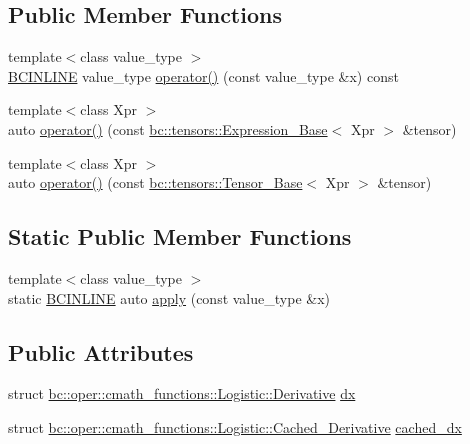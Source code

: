 \subsection*{Public Member Functions}
\begin{DoxyCompactItemize}
\item 
{\footnotesize template$<$class value\+\_\+type $>$ }\\\hyperlink{common_8h_a6699e8b0449da5c0fafb878e59c1d4b1}{B\+C\+I\+N\+L\+I\+NE} value\+\_\+type \hyperlink{structbc_1_1oper_1_1cmath__functions_1_1Logistic_acded51419444f65b49ba2504ac65e034}{operator()} (const value\+\_\+type \&x) const
\item 
{\footnotesize template$<$class Xpr $>$ }\\auto \hyperlink{structbc_1_1oper_1_1cmath__functions_1_1Logistic_a355f0d85fc7515ae5e8b7d804e101117}{operator()} (const \hyperlink{classbc_1_1tensors_1_1Expression__Base}{bc\+::tensors\+::\+Expression\+\_\+\+Base}$<$ Xpr $>$ \&tensor)
\item 
{\footnotesize template$<$class Xpr $>$ }\\auto \hyperlink{structbc_1_1oper_1_1cmath__functions_1_1Logistic_a722ef8ee07bd0966552de7101faddf66}{operator()} (const \hyperlink{classbc_1_1tensors_1_1Tensor__Base}{bc\+::tensors\+::\+Tensor\+\_\+\+Base}$<$ Xpr $>$ \&tensor)
\end{DoxyCompactItemize}
\subsection*{Static Public Member Functions}
\begin{DoxyCompactItemize}
\item 
{\footnotesize template$<$class value\+\_\+type $>$ }\\static \hyperlink{common_8h_a6699e8b0449da5c0fafb878e59c1d4b1}{B\+C\+I\+N\+L\+I\+NE} auto \hyperlink{structbc_1_1oper_1_1cmath__functions_1_1Logistic_ac01c5b86f77828ae7e3d46dd701684a6}{apply} (const value\+\_\+type \&x)
\end{DoxyCompactItemize}
\subsection*{Public Attributes}
\begin{DoxyCompactItemize}
\item 
struct \hyperlink{structbc_1_1oper_1_1cmath__functions_1_1Logistic_1_1Derivative}{bc\+::oper\+::cmath\+\_\+functions\+::\+Logistic\+::\+Derivative} \hyperlink{structbc_1_1oper_1_1cmath__functions_1_1Logistic_adc7232e506cfd2f4302b4e3ef7583f3b}{dx}
\item 
struct \hyperlink{structbc_1_1oper_1_1cmath__functions_1_1Logistic_1_1Cached__Derivative}{bc\+::oper\+::cmath\+\_\+functions\+::\+Logistic\+::\+Cached\+\_\+\+Derivative} \hyperlink{structbc_1_1oper_1_1cmath__functions_1_1Logistic_ac9b57c8b956597be63470e4f679a7cf1}{cached\+\_\+dx}
\end{DoxyCompactItemize}


